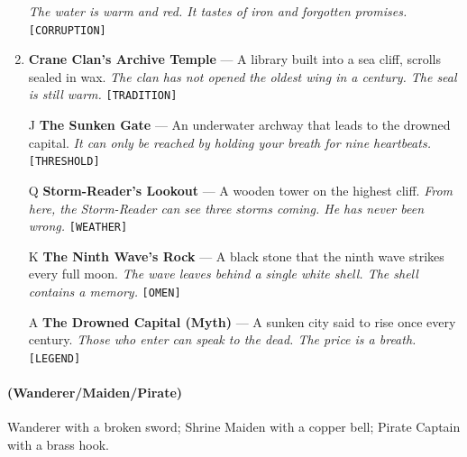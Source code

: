 \begin{enumerate}
  \hfill \textit{The water is warm and red. It tastes of iron and forgotten promises.} \texttt{[CORRUPTION]}
\item \textbf{Crane Clan's Archive Temple} --- A library built into a sea cliff, scrolls sealed in wax.
  \hfill \textit{The clan has not opened the oldest wing in a century. The seal is still warm.} \texttt{[TRADITION]}
\item[J] \textbf{The Sunken Gate} --- An underwater archway that leads to the drowned capital.
  \hfill \textit{It can only be reached by holding your breath for nine heartbeats.} \texttt{[THRESHOLD]}
\item[Q] \textbf{Storm-Reader's Lookout} --- A wooden tower on the highest cliff.
  \hfill \textit{From here, the Storm-Reader can see three storms coming. He has never been wrong.} \texttt{[WEATHER]}
\item[K] \textbf{The Ninth Wave's Rock} --- A black stone that the ninth wave strikes every full moon.
  \hfill \textit{The wave leaves behind a single white shell. The shell contains a memory.} \texttt{[OMEN]}
\item[A] \textbf{The Drowned Capital (Myth)} --- A sunken city said to rise once every century.
  \hfill \textit{Those who enter can speak to the dead. The price is a breath.} \texttt{[LEGEND]}
\end{enumerate}

\paragraph*{(Wanderer/Maiden/Pirate)} Wanderer with a broken sword; Shrine Maiden with a copper bell; Pirate Captain with a brass hook.


